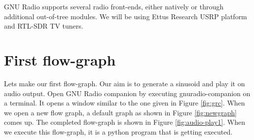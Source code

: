 \documentclass[a4paper,10pt]{report}
\begin{document}
GNU Radio supports several radio front-ends, either natively or through additional out-of-tree modules.
We will be using Ettus Research USRP platform and RTL-SDR TV tuners.

\section{First flow-graph}
Lets make our first flow-graph. Our aim is to generate a sinusoid and play it on audio output.
Open GNU Radio companion by executing gnuradio-companion on a terminal. 
It opens a window similar to the one given in Figure \ref{fig:grc}.
When we open a new flow graph, a default graph as shown in Figure \ref{fig:newgraph} comes up.
The completed flow-graph is shown in Figure \ref{fig:audio-play1}.
When we execute this flow-graph, it is a python program that is getting executed.
\end{document}

